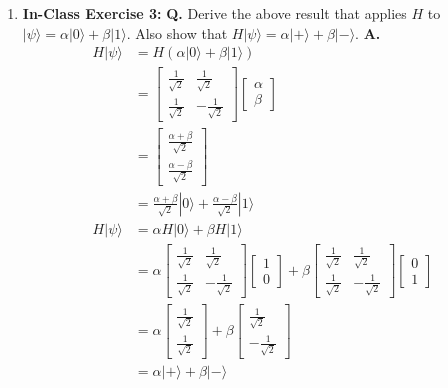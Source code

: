 \documentclass[main.tex]{subfiles}
\begin{document}
\begin{enumerate}
\item[] \textbf{In-Class Exercise 3:} \textbf{Q.} Derive the above result that applies $H$ to $|\psi\rangle=\alpha|0\rangle+\beta|1\rangle$. Also show that $H|\psi\rangle=\alpha|+\rangle+\beta|-\rangle$. \textbf{A.}
\begin{align*}
    H | \psi \rangle    & = H \left( \alpha | 0 \rangle + \beta | 1 \rangle \right) \\
                        & = \left[\begin{array}{ll} \frac{1}{\sqrt{2}} & \frac{1}{\sqrt{2}} \\ \frac{1}{\sqrt{2}} & -\frac{1}{\sqrt{2}} \end{array} \right] 
                        \left[\begin{array}{l} \alpha \\ \beta \end{array} \right]\\
                        & =  \left[\begin{array}{l} \frac{\alpha + \beta}{\sqrt{2}} \\ \frac{\alpha - \beta}{\sqrt{2}} \end{array} \right] \\
                        & = \frac{\alpha+\beta}{\sqrt{2}}|0\rangle+\frac{\alpha-\beta}{\sqrt{2}}|1\rangle \\
    H | \psi \rangle    & = \alpha H | 0 \rangle + \beta H | 1 \rangle \\
                        & =  \alpha \left[\begin{array}{ll} \frac{1}{\sqrt{2}} & \frac{1}{\sqrt{2}} \\ \frac{1}{\sqrt{2}} & -\frac{1}{\sqrt{2}} \end{array}\right] \left[\begin{array}{l} 1 \\ 0 \end{array} \right]
                        + \beta \left[\begin{array}{ll} \frac{1}{\sqrt{2}} & \frac{1}{\sqrt{2}} \\ \frac{1}{\sqrt{2}} & -\frac{1}{\sqrt{2}} \end{array}\right] \left[\begin{array}{l} 0 \\ 1 \end{array} \right]\\
                        & =  \alpha \left[\begin{array}{l} \frac{1}{\sqrt{2}} \\ \frac{1}{\sqrt{2}} \end{array} \right]
                        + \beta \left[\begin{array}{l} \frac{1}{\sqrt{2}} \\ -\frac{1}{\sqrt{2}} \end{array} \right]\\
                        & = \alpha | + \rangle + \beta | - \rangle
\end{align*}


\end{enumerate}
\end{document}
